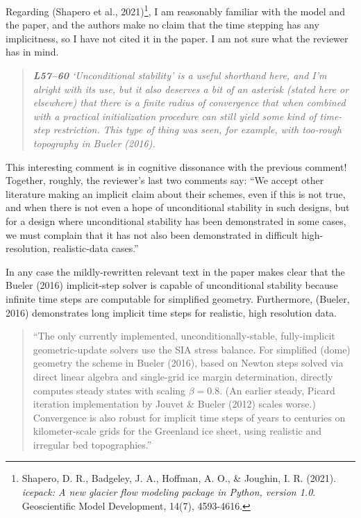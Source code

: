 \documentclass[letterpaper,final,12pt,reqno]{amsart}
\newenvironment{review}%
{\bigskip \par \begin{quote} \selectfont \sl}%
{\end{quote}}
\begin{document}
Regarding (Shapero et al., 2021)\footnote{Shapero, D. R., Badgeley, J. A., Hoffman, A. O., \& Joughin, I. R. (2021). \emph{icepack: A new glacier flow modeling package in Python, version 1.0}. Geoscientific Model Development, 14(7), 4593-4616.}, I am reasonably familiar with the model and the paper, and the authors make no claim that the time stepping has any implicitness, so I have not cited it in the paper.  I am not sure what the reviewer has in mind.

\begin{review}
\textbf{L57--60}  `Unconditional stability' is a useful shorthand here, and I'm alright with its use, but it also deserves a bit of an asterisk (stated here or elsewhere) that there is a finite radius of convergence that when combined with a practical initialization procedure can still yield some kind of time-step restriction.  This type of thing was seen, for example, with too-rough topography in Bueler (2016).
\end{review}

\noindent This interesting comment is in cognitive dissonance with the previous comment!  Together, roughly, the reviewer's last two comments say: ``We accept other literature making an implicit claim about their schemes, even if this is not true, and when there is not even a hope of unconditional stability in such designs, but for a design where unconditional stability has been demonstrated in some cases, we must complain that it has not also been demonstrated in difficult high-resolution, realistic-data cases.''

In any case the mildly-rewritten relevant text in the paper makes clear that the Bueler (2016) implicit-step solver is capable of unconditional stability because infinite time steps are computable for simplified geometry.  Furthermore, (Bueler, 2016) demonstrates long implicit time steps for realistic, high resolution data.

\begin{quote}
``The only currently implemented, unconditionally-stable, fully-implicit geometric-update solvers use the SIA stress balance.  For simplified (dome) geometry the scheme in Bueler (2016), based on Newton steps solved via direct linear algebra and single-grid ice margin determination, directly computes steady states with scaling $\beta=0.8$.  (An earlier steady, Picard iteration implementation by Jouvet \& Bueler (2012) scales worse.)  Convergence is also robust for implicit time steps of years to centuries on kilometer-scale grids for the Greenland ice sheet, using realistic and irregular bed topographies.''
\end{quote}
\end{document}
